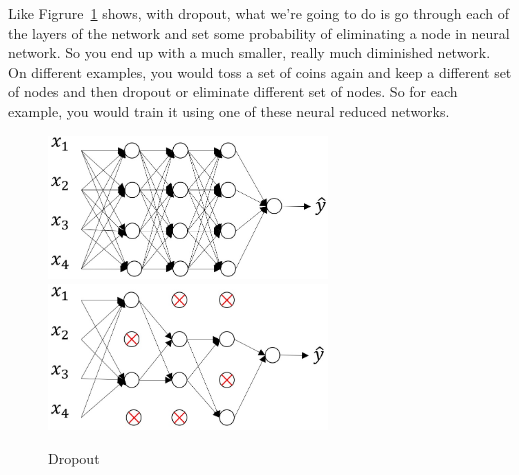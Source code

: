\documentclass[UTF8]{article}
\begin{document}
Like Figrure~\ref{fig:dropout} shows, with dropout, what we're going to do is go through each of
the layers of the network and set some probability of eliminating a node in neural network. So you
end up with a much smaller, really much diminished network. On different examples, you would toss a
set of coins again and keep a different set of nodes and then dropout or eliminate different set of
nodes. So for each example, you would train it using one of these neural reduced networks.

\begin{figure}[htb]
    \centering
    \includegraphics[width=20em]{figures/dropout-orig}
    \includegraphics[width=20em]{figures/dropout-zero-out}
    \caption{Dropout}
    \label{fig:dropout}
\end{figure}
\end{document}
